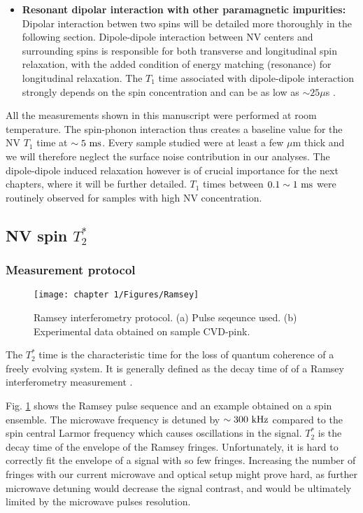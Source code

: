 \documentclass[a4paper,11pt]{report}
\begin{document}
\begin{refsection}
\begin{itemize}
\item \textbf{Resonant dipolar interaction with other paramagnetic impurities:} Dipolar interaction betwen two spins will be detailed more thoroughly in the following section. Dipole-dipole interaction between NV centers and surrounding spins is responsible for both transverse and longitudinal spin relaxation, with the added condition of energy matching (resonance) for longitudinal relaxation. The $T_1$ time associated with dipole-dipole interaction strongly depends on the spin concentration and can be as low as $\sim 25 \mu$s \citep{hall2016detection}.
\end{itemize}

All the measurements shown in this manuscript were performed at room temperature. The spin-phonon interaction thus creates a baseline value for the NV $T_1$ time at $\sim 5\ \rm ms$. Every sample studied were at least a few $\mu$m thick and we will therefore neglect the surface noise contribution in our analyses. The dipole-dipole induced relaxation however is of crucial importance for the next chapters, where it will be further detailed. $T_1$ times between $0.1 \sim 1\ \rm ms$ were routinely observed for samples with high NV concentration.

\subsection{NV spin $T_2^*$}
\subsubsection{Measurement protocol}
\begin{figure}[h!]
\centering
\texttt{[image: chapter 1/Figures/Ramsey]}
\caption{Ramsey interferometry protocol. (a) Pulse seqeunce used. (b) Experimental data obtained on sample CVD-pink.} %
\label{Ramsey}
\end{figure}

The $T_2^*$ time is the characteristic time for the loss of quantum coherence of a freely evolving system. It is generally defined as the decay time of of a Ramsey interferometry measurement \citep{barry2020sensitivity}.

Fig. \ref{Ramsey} shows the Ramsey pulse sequence and an  example obtained on a spin ensemble. The microwave frequency is detuned by $\sim 300\ \rm kHz$ compared to the spin central Larmor frequency which causes oscillations in the signal. $T_2^*$ is the decay time of the envelope of the Ramsey fringes. Unfortunately, it is hard to correctly fit the envelope of a signal with so few fringes. Increasing the number of fringes with our current microwave and optical setup might prove hard, as further microwave detuning would decrease the signal contrast, and would be ultimately limited by the microwave pulses resolution.


\end{refsection}
\end{document}
